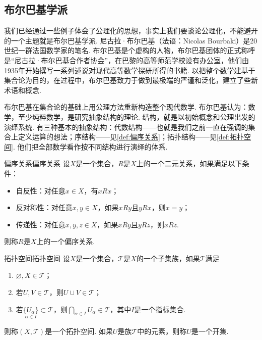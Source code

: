 \subsection{布尔巴基学派}

我们已经通过一些例子体会了公理化的思想，事实上我们要谈论公理化，不能避开的一个主题就是布尔巴基学派. 尼古拉·布尔巴基（法语：Nicolas Bourbaki）是20世纪一群法国数学家的笔名. 布尔巴基是个虚构的人物，布尔巴基团体的正式称呼是``尼古拉·布尔巴基合作者协会''，在巴黎的高等师范学校设有办公室，他们由1935年开始撰写一系列述说对现代高等数学探研所得的书籍. 以把整个数学建基于集合论为目的，在过程中，布尔巴基致力于做到最极端的严谨和泛化，建立了些新术语和概念.

布尔巴基在集合论的基础上用公理方法重新构造整个现代数学. 布尔巴基认为：数学，至少纯粹数学，是研究抽象结构的理论. 结构，就是以初始概念和公理出发的演绎系统. 有三种基本的抽象结构：代数结构——也就是我们之前一直在强调的集合上定义运算的想法；序结构——见\autoref{def:偏序关系}；拓扑结构——见\autoref{def:拓扑空间}. 他们把全部数学看作按不同结构进行演绎的体系.

\begin{definition}{偏序关系}{偏序关系}
    设$X$是一个集合，$R$是$X$上的一个二元关系，如果满足以下条件：
    \begin{itemize}
        \item 自反性：对任意$x\in X$，有$x R x$；
        \item 反对称性：对任意$x,y\in X$，如果$x R y$且$y R x$，则$x=y$；
        \item 传递性：对任意$x,y,z\in X$，如果$x R y$且$y R z$，则$x R z$.
    \end{itemize}
    则称$R$是$X$上的一个偏序关系.
\end{definition}


\begin{definition}{拓扑空间}{拓扑空间}
    设$X$是一个集合，$\mathscr{T}$是$X$的一个子集族，如果$\mathscr{T}$满足
    \begin{enumerate}
        \item $\varnothing,X\in \mathscr{T}$；

        \item 若$U,V\in \mathscr{T}$，则$U\cup V\in \mathscr{T}$；

        \item 若$\underset{\alpha\in I}{\{U_\alpha\}}\subset \mathscr{T}$，则$\bigcap\limits_{\alpha\in I}U_\alpha\in \mathscr{T}$，其中$I$是一个指标集合.
    \end{enumerate}
    则称$(X,\mathscr{T})$是一个拓扑空间. 如果$U$是族$\mathscr{T}$中的元素，则称$U$是一个开集.
\end{definition}


